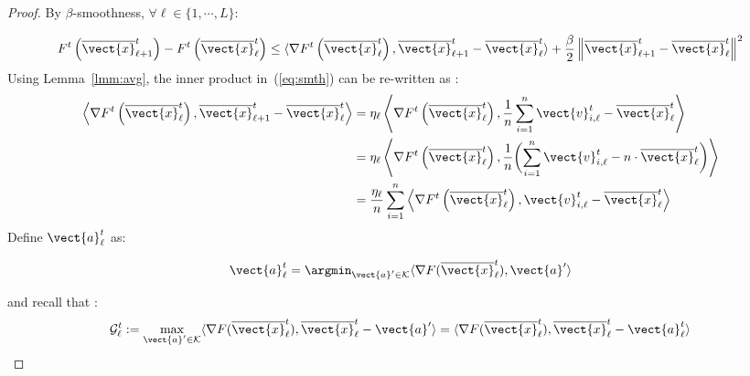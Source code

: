 %
\begin{proof}
By $\beta$-smoothness, $\forall \ell \in \{1, \cdots, L\}$: 

\begin{equation}\label{eq:smth}
    F^{t}\left( \overline{\vect{x}}^{t}_{\ell+1} \right) - F^{t} \left( \overline{\vect{x}}^{t}_{\ell} \right) \leq \langle \nabla F^{t} \left( \overline{\vect{x}}^t_{\ell} \right), \overline{\vect{x}}^t_{\ell+1} - \overline{\vect{x}}^t_{\ell} \rangle + \frac{\beta}{2} \left \| \overline{\vect{x}}^t_{\ell+1} - \overline{\vect{x}}^t_{\ell} \right\|^{2}
\end{equation} 
\newline 
Using Lemma~\ref{lmm:avg}, the inner product in~(\ref{eq:smth}) can be re-written as : 
\begin{equation}
\label{eq:inner_beta}
    \begin{aligned}
        \left \langle \nabla F^{t} \left( \overline{\vect{x}}^t_{\ell} \right), \overline{\vect{x}}^t_{\ell+1} - \overline{\vect{x}}^t_{\ell} \right \rangle
        & = \eta_{\ell} \left \langle \nabla F^{t} \left( \overline{\vect{x}}^t_{\ell} \right), \frac{1}{n}\sum_{i=1}^{n} \vect{v}^t_{i,\ell} - \overline{\vect{x}}^t_{\ell} \right \rangle \\
        &= \eta_{\ell} \left \langle \nabla F^{t} \left( \overline{\vect{x}}^t_{\ell} \right),  \frac{1}{n} \biggl(\sum_{i=1}^{n} \vect{v}^t_{i,\ell} - n \cdot \overline{\vect{x}}^t_{\ell} \biggr) \right \rangle \\
        &=  \frac{\eta_{\ell}}{n}\sum_{i=1}^{n} \left \langle \nabla F^{t} \left( \overline{\vect{x}}^t_{\ell} \right), \vect{v}^t_{i,\ell} - \overline{\vect{x}}^t_{\ell} \right \rangle
    \end{aligned}
\end{equation} 
\newline
Define $\vect{a}^t_{\ell}$ as:
\begin{linenomath}
    \begin{align*}
        \vect{a}^t_{\ell} = \argmin_{\vect{a}^{\prime} \in \mathcal{K}}\langle \nabla F(\overline{\vect{x}}^t_{\ell}),\vect{a}^{\prime} \rangle
    \end{align*}
\end{linenomath}
and recall that :
\begin{equation*}
 \mathcal{G}^t_{\ell} := \max_{\vect{a}^{\prime} \in \mathcal{K}}\langle \nabla F(\overline{\vect{x}}^t_{\ell}), \overline{\vect{x}}^t_{\ell} - \vect{a}^{\prime}\rangle = \langle \nabla F(\overline{\vect{x}}^t_{\ell}), \overline{\vect{x}}^t_{\ell} - \vect{a}^t_{\ell}\rangle

\end{equation*}
\end{proof}
